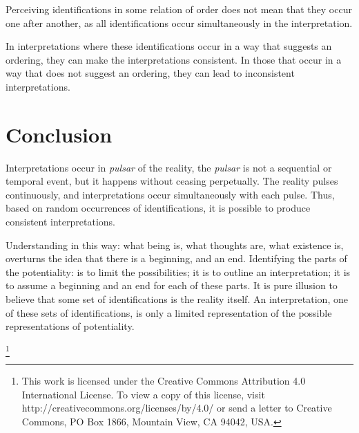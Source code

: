 \documentclass[11pt]{article}
\begin{document}
	Perceiving identifications in some relation of order does not mean that they occur one after another, as all identifications occur simultaneously in the interpretation.
	
	In interpretations where these identifications occur in a way that suggests an ordering, they can make the interpretations consistent. In those that occur in a way that does not suggest an ordering, they can lead to inconsistent interpretations.

	\section{Conclusion} \label{pt-s7}
	
	Interpretations occur in \textit{pulsar} of the reality, the \textit{pulsar} is not a sequential or temporal event, but it happens without ceasing perpetually. The reality pulses continuously, and interpretations occur simultaneously with each pulse. Thus, based on random occurrences of identifications, it is possible to produce consistent interpretations.
	
	Understanding in this way: what being is, what thoughts are, what existence is, overturns the idea that there is a beginning, and an end. Identifying the parts of the potentiality: is to limit the possibilities; it is to outline an interpretation; it is to assume a beginning and an end for each of these parts. It is pure illusion to believe that some set of identifications is the reality itself. An interpretation, one of these sets of identifications, is only a limited representation of the possible representations of potentiality.
	
	\footnote{This work is licensed under the Creative Commons Attribution 4.0 International License. To view a copy of this license, visit http://creativecommons.org/licenses/by/4.0/ or send a letter to Creative Commons, PO Box 1866, Mountain View, CA 94042, USA.}
\end{document}
